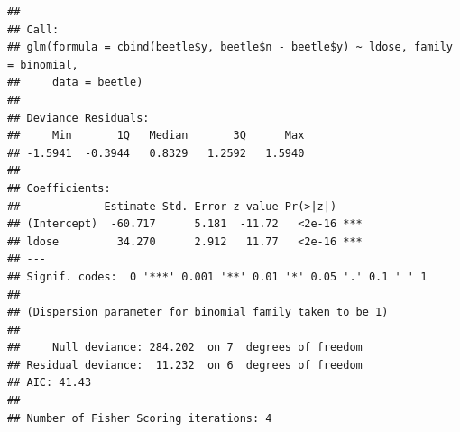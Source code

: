 \documentclass[
  ignorenonframetext,
]{beamer}
\newenvironment{Shaded}{\begin{snugshade}}{\end{snugshade}}
\newcommand{\AttributeTok}[1]{\textcolor[rgb]{0.13,0.29,0.53}{#1}}
\newcommand{\FunctionTok}[1]{\textcolor[rgb]{0.13,0.29,0.53}{\textbf{#1}}}
\newcommand{\NormalTok}[1]{#1}
\newcommand{\OtherTok}[1]{\textcolor[rgb]{0.56,0.35,0.01}{#1}}
\newcommand{\SpecialCharTok}[1]{\textcolor[rgb]{0.81,0.36,0.00}{\textbf{#1}}}
\begin{document}
\begin{frame}[fragile]
\tiny

\begin{Shaded}
\end{Shaded}

\begin{verbatim}
## 
## Call:
## glm(formula = cbind(beetle$y, beetle$n - beetle$y) ~ ldose, family = binomial, 
##     data = beetle)
## 
## Deviance Residuals: 
##     Min       1Q   Median       3Q      Max  
## -1.5941  -0.3944   0.8329   1.2592   1.5940  
## 
## Coefficients:
##             Estimate Std. Error z value Pr(>|z|)    
## (Intercept)  -60.717      5.181  -11.72   <2e-16 ***
## ldose         34.270      2.912   11.77   <2e-16 ***
## ---
## Signif. codes:  0 '***' 0.001 '**' 0.01 '*' 0.05 '.' 0.1 ' ' 1
## 
## (Dispersion parameter for binomial family taken to be 1)
## 
##     Null deviance: 284.202  on 7  degrees of freedom
## Residual deviance:  11.232  on 6  degrees of freedom
## AIC: 41.43
## 
## Number of Fisher Scoring iterations: 4
\end{verbatim}

\normalsize
\end{frame}
\end{document}
